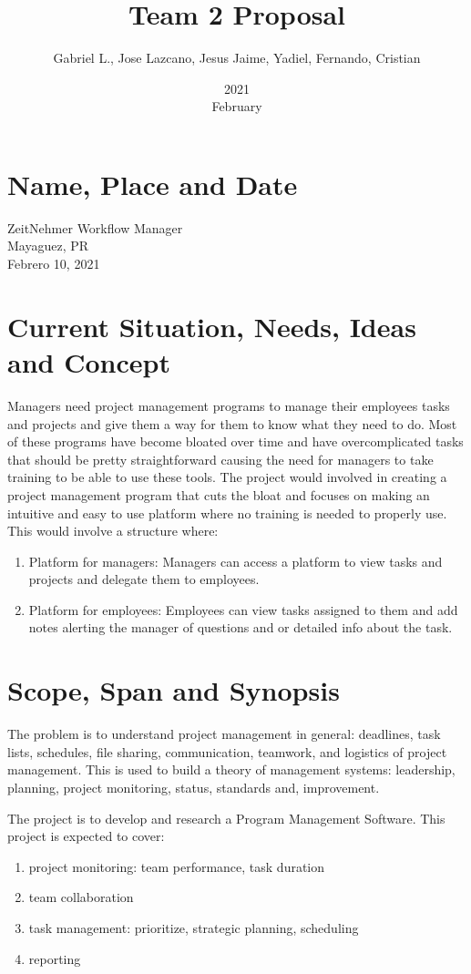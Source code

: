 \documentclass{article}
\title{Team 2 Proposal}
\date{2021 \\ February}
\author{Gabriel L., Jose Lazcano, Jesus Jaime, Yadiel, Fernando, Cristian}
\begin{document}
\maketitle
\section{Name, Place and Date}
ZeitNehmer Workflow Manager\\
Mayaguez, PR\\
Febrero 10, 2021
\section{Current Situation, Needs, Ideas and Concept}
\vspace{10}
Managers need project management programs to manage their employees tasks and projects and give them a way for them to know what they need to do. Most of these programs have become bloated over time and have overcomplicated tasks that should be pretty straightforward causing the need for managers to take training to be able to use these tools. The project would involved in creating a project management program that cuts the bloat and focuses on making an intuitive and easy to use platform where no training is needed to properly use. This would involve a structure where:
\begin{enumerate}
\item Platform for managers: Managers can access a platform to view tasks and projects and delegate them to employees.
\item Platform for employees: Employees can view tasks assigned to them and add notes alerting the manager of questions and or detailed info about the task.
\end{enumerate}
\section{Scope, Span and Synopsis}
\vspace{10}
The problem is to understand project management in general: deadlines, task lists, schedules, file sharing, communication, teamwork, and logistics of project management. This is used to build a theory of management systems: leadership, planning, project monitoring, status, standards and, improvement.

The project is to develop and research a Program Management Software. This project is expected to cover:
\begin{enumerate}
    \item project monitoring: team performance, task duration
    \item team collaboration
    \item task management: prioritize, strategic planning,  scheduling
    \item reporting
\end{enumerate}
\end{document}

